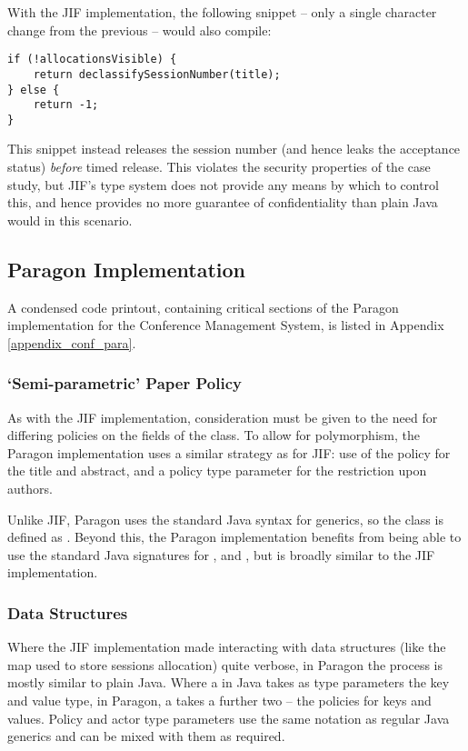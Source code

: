 With the JIF implementation, the following snippet -- only a single character change from the previous -- would also compile:

\begin{verbatim}
if (!allocationsVisible) {
	return declassifySessionNumber(title);
} else {
	return -1;
}
\end{verbatim}

This snippet instead releases the session number (and hence leaks the acceptance status) \textit{before} timed release. This violates the security properties of the case study, but JIF's type system does not provide any means by which to control this, and hence provides no more guarantee of confidentiality than plain Java would in this scenario.

\subsection{Paragon Implementation}

A condensed code printout, containing critical sections of the Paragon implementation for the Conference Management System, is listed in Appendix \ref{appendix_conf_para}.

\subsubsection{`Semi-parametric' Paper Policy}

As with the JIF implementation, consideration must be given to the need for differing policies on the fields of the  class. To allow for polymorphism, the Paragon implementation uses a similar strategy as for JIF: use of the  policy for the title and abstract, and a policy type parameter for the restriction upon authors.

Unlike JIF, Paragon uses the standard Java syntax for generics, so the class is defined as . Beyond this, the Paragon implementation benefits from being able to use the standard Java signatures for ,  and , but is broadly similar to the JIF implementation.

\subsubsection{Data Structures}

Where the JIF implementation made interacting with data structures (like the map used to store sessions allocation) quite verbose, in Paragon the process is mostly similar to plain Java. Where a  in Java takes as type parameters the key and value type, in Paragon, a  takes a further two -- the policies for keys and values. Policy and actor type parameters use the same notation as regular Java generics and can be mixed with them as required.

